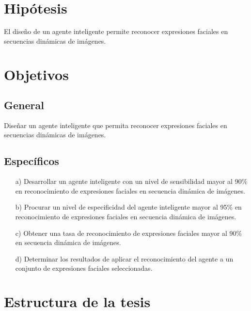 \section{Hipótesis}

El diseño de un agente inteligente permite reconocer expresiones faciales en secuencias dinámicas de imágenes.


\section{Objetivos}

\subsection{General}
Diseñar un agente inteligente que permita reconocer expresiones faciales en secuencias dinámicas de imágenes.


\subsection{Específicos}
\begin{enumerate}
\item[a)] Desarrollar un agente inteligente con un nivel de sensibilidad mayor al 90\% en reconocimiento de expresiones faciales en secuencia dinámica de imágenes.

\item[b)] Procurar  un nivel de especificidad del agente inteligente mayor al 95\% en reconocimiento de expresiones faciales en secuencia dinámica de imágenes.

\item[c)] Obtener una tasa de reconocimiento de expresiones faciales mayor al 90\% en secuencia dinámica de imágenes.

\item[d)] Determinar los resultados de aplicar el reconocimiento del agente a un conjunto de expresiones faciales seleccionadas.
\end{enumerate}


\section{Estructura de la tesis}

